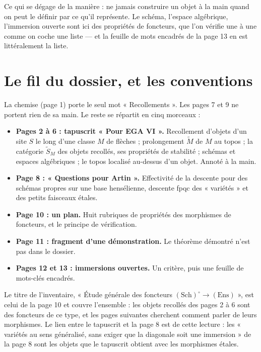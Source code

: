 \documentclass[11pt,a4paper]{article}
\begin{document}
\begin{resume}
Ce qui se dégage de la manière : ne jamais construire un objet à la main
quand on peut le définir par ce qu'il représente. Le schéma, l'espace
algébrique, l'immersion ouverte sont ici des propriétés de foncteurs, que
l'on vérifie une à une comme on coche une liste — et la feuille de mots
encadrés de la page 13 en est littéralement la liste.

\end{resume}

\section*{Le fil du dossier, et les conventions}

La chemise (page 1) porte le seul mot « Recollements ». Les pages 7 et 9 ne
portent rien de sa main. Le reste se répartit en cinq morceaux :

\begin{itemize}
  \item \textbf{Pages 2 à 6 : tapuscrit « Pour EGA VI ».} Recollement d'objets
    d'un site $S$ le long d'une classe $M$ de flèches ; prolongement $\widetilde{M}$
    de $M$ au topos ; la catégorie $\widetilde{S}_M$ des objets recollés, ses
    propriétés de stabilité ; schémas et espaces algébriques ; le topos
    localisé au-dessus d'un objet. Annoté à la main.
  \item \textbf{Page 8 : « Questions pour Artin ».} Effectivité de la descente
    pour des schémas propres sur une base hensélienne, descente fpqc des
    « variétés » et des petits faisceaux étales.
  \item \textbf{Page 10 : un plan.} Huit rubriques de propriétés des morphismes
    de foncteurs, et le principe de vérification.
  \item \textbf{Page 11 : fragment d'une démonstration.} Le théorème démontré
    n'est pas dans le dossier.
  \item \textbf{Pages 12 et 13 : immersions ouvertes.} Un critère, puis une
    feuille de mots-clés encadrés.
\end{itemize}

Le titre de l'inventaire, « Étude générale des foncteurs
$(\mathrm{Sch})^{\circ} \to (\mathrm{Ens})$ », est celui de la page 10 et
couvre l'ensemble : les objets recollés des pages 2 à 6 sont des foncteurs de
ce type, et les pages suivantes cherchent comment parler de leurs morphismes.
Le lien entre le tapuscrit et la page 8 est de cette lecture : les
« variétés au sens généralisé, sans exiger que la diagonale soit une
immersion » de la page 8 sont les objets que le tapuscrit obtient avec les
morphismes étales.
\end{document}
